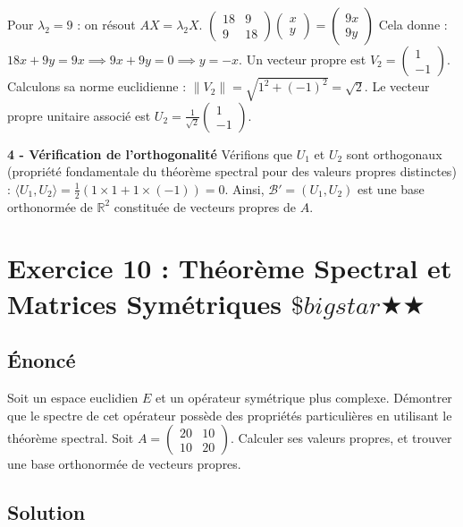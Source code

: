\documentclass[11pt,a4paper]{article}
\begin{document}
Pour $\lambda_2 = 9$ : on résout $AX = \lambda_2 X$.
$\begin{pmatrix} 18 & 9 \\ 9 & 18 \end{pmatrix} \begin{pmatrix} x \\ y \end{pmatrix} = \begin{pmatrix} 9x \\ 9y \end{pmatrix}$
Cela donne :
$18x + 9y = 9x \implies 9x + 9y = 0 \implies y = -x$.
Un vecteur propre est $V_2 = \begin{pmatrix} 1 \\ -1 \end{pmatrix}$.
Calculons sa norme euclidienne : $\|V_2\| = \sqrt{1^2 + (-1)^2} = \sqrt{2}$.
Le vecteur propre unitaire associé est $U_2 = \frac{1}{\sqrt{2}} \begin{pmatrix} 1 \\ -1 \end{pmatrix}$.

\textbf{4 - Vérification de l'orthogonalité}
Vérifions que $U_1$ et $U_2$ sont orthogonaux (propriété fondamentale du théorème spectral pour des valeurs propres distinctes) :
$\langle U_1, U_2 \rangle = \frac{1}{2} (1 \times 1 + 1 \times (-1)) = 0$.
Ainsi, $\mathcal{B}' = (U_1, U_2)$ est une base orthonormée de $\mathbb{R}^2$ constituée de vecteurs propres de $A$.

\newpage
\section{Exercice 10 : Théorème Spectral et Matrices Symétriques \quad $\$bigstar$\bigstar$\bigstar$\bigstar$\bigstar$}

\subsection{Énoncé}
Soit un espace euclidien $E$ et un opérateur symétrique plus complexe.
Démontrer que le spectre de cet opérateur possède des propriétés particulières en utilisant le théorème spectral.
Soit $A = \begin{pmatrix} 20 & 10 \\ 10 & 20 \end{pmatrix}$.
Calculer ses valeurs propres, et trouver une base orthonormée de vecteurs propres.

\subsection{Solution}
\end{document}
